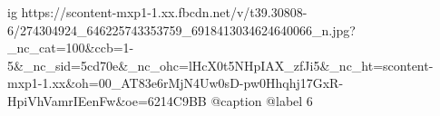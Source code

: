  
 
 
 
 

\ifcmt
  ig https://scontent-mxp1-1.xx.fbcdn.net/v/t39.30808-6/274304924_646225743353759_6918413034624640066_n.jpg?_nc_cat=100&ccb=1-5&_nc_sid=5cd70e&_nc_ohc=lHcX0t5NHpIAX_zfJi5&_nc_ht=scontent-mxp1-1.xx&oh=00_AT83e6rMjN4Uw0sD-pw0Hhqhj17GxR-HpiVhVamrIEenFw&oe=6214C9BB
  @caption @label 6
\fi
